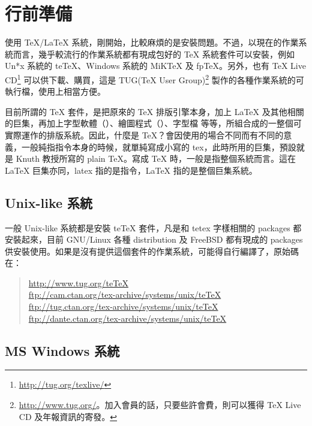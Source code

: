 
\chapter{行前準備}

使用 \TeX{}/\LaTeX{} 系統，剛開始，比較麻煩的是安裝問題。不過，以現在的作業系統而言，幾乎較流行的作業系統都有現成包好的 \TeX{} 系統套件可以安裝，例如 Un*x 系統的 te\TeX{}、Windows 系統的 MiK\TeX{} 及 fp\TeX{}。另外，也有
\TeX{} Live CD\footnote{\url{http://tug.org/texlive/}}
可以供下載、購買，這是
TUG(\TeX{} User Group)\footnote{\url{http://www.tug.org/}。加入會員的話，只要些許會費，則可以獲得 \TeX{} Live CD 及年報資訊的寄發。}
製作的各種作業系統的可執行檔，使用上相當方便。

目前所謂的 \TeX{} 套件，是把原來的 \TeX{} 排版引擎本身，加上 \LaTeX{} 及其他相關的巨集，再加上字型軟體（\MF{}）、繪圖程式（\MP{}）、字型檔 \chdots{} 等等，所組合成的一整個可實際運作的排版系統。因此，什麼是 \TeX{}？會因使用的場合不同而有不同的意義，一般純指指令本身的時候，就單純寫成小寫的 {\ttfamily tex}，此時所用的巨集，預設就是 Knuth 教授所寫的 plain \TeX{}。寫成 \TeX{} 時，一般是指整個系統而言。這在 \LaTeX{} 巨集亦同，{\ttfamily latex} 指的是指令，\LaTeX{} 指的是整個巨集系統。

\section{Unix-like 系統}

一般 Unix-like 系統都是安裝 te\TeX{} 套件，凡是和 {\ttfamily tetex} 字樣相關的 packages 都安裝起來，目前 GNU/Linux 各種 distribution 及 FreeBSD 都有現成的 packages 供安裝使用。如果是沒有提供這個套件的作業系統，可能得自行編譯了，原始碼在：

\begin{quote}
   \url{http://www.tug.org/teTeX}                            \\
   \url{ftp://cam.ctan.org/tex-archive/systems/unix/teTeX}   \\
   \url{ftp://tug.ctan.org/tex-archive/systems/unix/teTeX}   \\
   \url{ftp://dante.ctan.org/tex-archive/systems/unix/teTeX}
\end{quote}


\section{MS Windows 系統}

